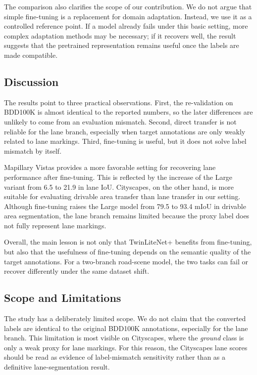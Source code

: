 \documentclass[conference]{IEEEtran}
\begin{document}
The comparison also clarifies the scope of our contribution. We do not argue that simple fine-tuning is a replacement for domain adaptation. Instead, we use it as a controlled reference point. If a model already fails under this basic setting, more complex adaptation methods may be necessary; if it recovers well, the result suggests that the pretrained representation remains useful once the labels are made compatible.

\subsection{Discussion}
The results point to three practical observations. First, the re-validation on BDD100K is almost identical to the reported numbers, so the later differences are unlikely to come from an evaluation mismatch. Second, direct transfer is not reliable for the lane branch, especially when target annotations are only weakly related to lane markings. Third, fine-tuning is useful, but it does not solve label mismatch by itself.

Mapillary Vistas provides a more favorable setting for recovering lane performance after fine-tuning. This is reflected by the increase of the Large variant from 6.5 to 21.9 in lane IoU. Cityscapes, on the other hand, is more suitable for evaluating drivable area transfer than lane transfer in our setting. Although fine-tuning raises the Large model from 79.5 to 93.4 mIoU in drivable area segmentation, the lane branch remains limited because the proxy label does not fully represent lane markings.

Overall, the main lesson is not only that TwinLiteNet+ benefits from fine-tuning, but also that the usefulness of fine-tuning depends on the semantic quality of the target annotations. For a two-branch road-scene model, the two tasks can fail or recover differently under the same dataset shift.

\subsection{Scope and Limitations}
The study has a deliberately limited scope. We do not claim that the converted labels are identical to the original BDD100K annotations, especially for the lane branch. This limitation is most visible on Cityscapes, where the \textit{ground} class is only a weak proxy for lane markings. For this reason, the Cityscapes lane scores should be read as evidence of label-mismatch sensitivity rather than as a definitive lane-segmentation result.
\end{document}
